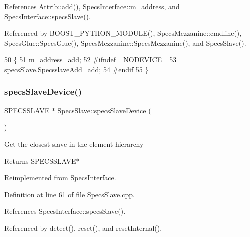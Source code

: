 References Attrib\+::add(), Specs\+Interface\+::m\+\_\+address, and Specs\+Interface\+::specs\+Slave().



Referenced by B\+O\+O\+S\+T\+\_\+\+P\+Y\+T\+H\+O\+N\+\_\+\+M\+O\+D\+U\+L\+E(), Specs\+Mezzanine\+::cmdline(), Specs\+Glue\+::\+Specs\+Glue(), Specs\+Mezzanine\+::\+Specs\+Mezzanine(), and Specs\+Slave().


\begin{DoxyCode}
50                                             \{
51   \hyperlink{classSpecsInterface_a4064da5ca6e0a172363967c4acc0b365}{m\_address}=\hyperlink{classAttrib_a235f773af19c900264a190b00a3b4ad7}{add};
52 \textcolor{preprocessor}{#ifndef \_NODEVICE\_
}
53   \hyperlink{classSpecsInterface_a13cf39bddfa8ba21d6e6aa78e78f0e4f}{specsSlave}.SpecsslaveAdd=\hyperlink{classAttrib_a235f773af19c900264a190b00a3b4ad7}{add};
54 \textcolor{preprocessor}{#endif
}
55 \}
\end{DoxyCode}
\mbox{\label{classSpecsSlave_a44970aca61b6fdcd6d6d90e6601093f3}} 
\subsubsection{\texorpdfstring{specs\+Slave\+Device()}{specsSlaveDevice()}}
{\footnotesize\ttfamily S\+P\+E\+C\+S\+S\+L\+A\+VE $\ast$ Specs\+Slave\+::specs\+Slave\+Device (\begin{DoxyParamCaption}{ }\end{DoxyParamCaption})\hspace{0.3cm}{\ttfamily [virtual]}}

Get the closest slave in the element hierarchy \begin{DoxyReturn}{Returns}
S\+P\+E\+C\+S\+S\+L\+A\+V\+E$\ast$ 
\end{DoxyReturn}


Reimplemented from \hyperlink{classSpecsInterface_ac8d4711197f484f055533ec1e5ae01a1}{Specs\+Interface}.



Definition at line 61 of file Specs\+Slave.\+cpp.



References Specs\+Interface\+::specs\+Slave().



Referenced by detect(), reset(), and reset\+Internal().


